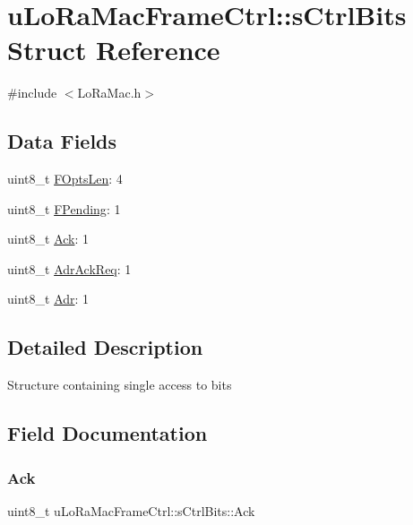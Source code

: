 \hypertarget{structuLoRaMacFrameCtrl_1_1sCtrlBits}{}\section{u\+Lo\+Ra\+Mac\+Frame\+Ctrl\+:\+:s\+Ctrl\+Bits Struct Reference}
\label{structuLoRaMacFrameCtrl_1_1sCtrlBits}


{\ttfamily \#include $<$Lo\+Ra\+Mac.\+h$>$}

\subsection*{Data Fields}
\begin{DoxyCompactItemize}
\item 
uint8\+\_\+t \hyperlink{structuLoRaMacFrameCtrl_1_1sCtrlBits_a2898f8aaf6f0d8bf96a6f1677085abbf}{F\+Opts\+Len}\+: 4
\item 
uint8\+\_\+t \hyperlink{structuLoRaMacFrameCtrl_1_1sCtrlBits_a4ba21bdef24bb0b4c129604611af3cf8}{F\+Pending}\+: 1
\item 
uint8\+\_\+t \hyperlink{structuLoRaMacFrameCtrl_1_1sCtrlBits_a05a3ebfac76baf31edcd09c257e6ebe6}{Ack}\+: 1
\item 
uint8\+\_\+t \hyperlink{structuLoRaMacFrameCtrl_1_1sCtrlBits_af3dbb47839d639d24fd55167e64509bf}{Adr\+Ack\+Req}\+: 1
\item 
uint8\+\_\+t \hyperlink{structuLoRaMacFrameCtrl_1_1sCtrlBits_a8ed08fbd800faa9668e74ca29115a2a9}{Adr}\+: 1
\end{DoxyCompactItemize}


\subsection{Detailed Description}
Structure containing single access to bits 

\subsection{Field Documentation}
\mbox{\label{structuLoRaMacFrameCtrl_1_1sCtrlBits_a05a3ebfac76baf31edcd09c257e6ebe6}} 
\subsubsection{\texorpdfstring{Ack}{Ack}}
{\footnotesize\ttfamily uint8\+\_\+t u\+Lo\+Ra\+Mac\+Frame\+Ctrl\+::s\+Ctrl\+Bits\+::\+Ack}

